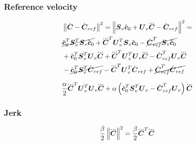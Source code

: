 \subsubsection{Reference velocity}
\begin{equation*}
\begin{split}
    &\norm{\cVel - \cVel_{ref}}^2 
    = 
    \norm{\M{S}_v \cstate_0  +  \M{U}_v \cJerk  -  \cVel_{ref}}^ 2 
    = \\
    & \cancel{\cstate_0^T \M{S}_v^T  \M{S}_v \cstate_0}  
    +  
    \cJerk^T \M{U}_v^T \M{S}_v \cstate_0  
    -  
    \cancel{\cVel_{ref}^T \M{S}_v \cstate_0}\\
%
    & +  
    \cstate_0^T \M{S}_v^T \M{U}_v \cJerk  
    +  
    \cJerk^T \M{U}_v^T \M{U}_v \cJerk   
    -  
    \cVel_{ref}^T \M{U}_v \cJerk\\
%
    & -  
    \cancel{\cstate_0^T \M{S}_v^T \cVel_{ref}}  
    -  
    \cJerk^T \M{U}_v^T \cVel_{ref}  
    +  
    \cancel{\cVel_{ref}^T \cVel_{ref}}
\end{split}
\end{equation*}

\begin{equation*}
    \frac{\alpha}{2} \cJerk^T \M{U}_v^T \M{U}_v \cJerk  
    +  
    \alpha 
    \left(
        \cstate_0^T \M{S}_v^T \M{U}_v
        -
        \cVel_{ref}^T \M{U}_v 
    \right)
    \cJerk 
\end{equation*}

\subsubsection{Jerk}
\begin{equation*}
    \frac{\beta}{2}  \norm{\cJerk}^2 = \frac{\beta}{2} \cJerk^T \cJerk
\end{equation*}


